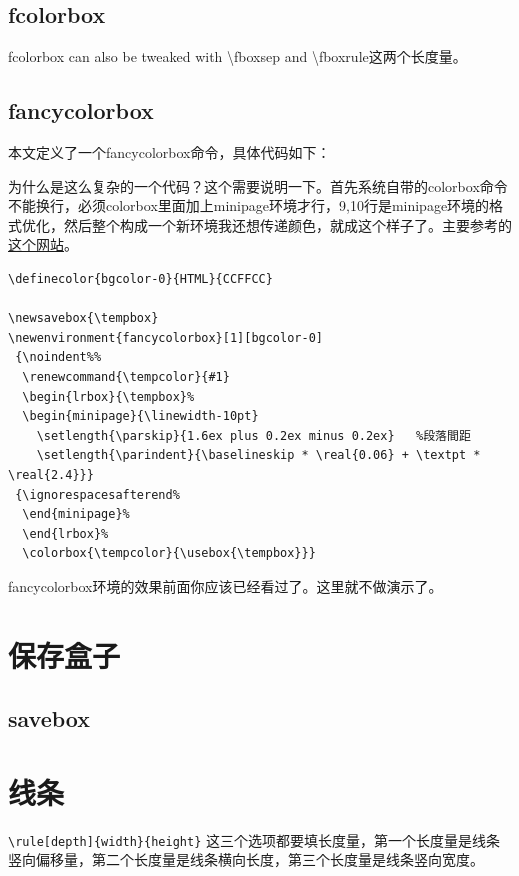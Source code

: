 \documentclass[11pt,oneside]{book}
\newlength{\textpt}
\begin{document}
\begin{common-format}
\subsection{fcolorbox}
fcolorbox can also be tweaked with \textbackslash fboxsep and \textbackslash fboxrule这两个长度量。

\subsection{fancycolorbox}
本文定义了一个fancycolorbox命令，具体代码如下：\\
\begin{fancycolorbox}
为什么是这么复杂的一个代码？这个需要说明一下。首先系统自带的colorbox命令不能换行，必须colorbox里面加上minipage环境才行，9,10行是minipage环境的格式优化，然后整个构成一个新环境我还想传递颜色，就成这个样子了。主要参考的\href{http://tex.stackexchange.com/questions/127612/color-text-and-bg-of-verbatim-without-affecting-fancyvrb-line-numbers}{这个网站}。
\end{fancycolorbox}
\vspace{20pt}
\begin{Verbatim}
\definecolor{bgcolor-0}{HTML}{CCFFCC} 

\newsavebox{\tempbox}
\newenvironment{fancycolorbox}[1][bgcolor-0]
 {\noindent%%
  \renewcommand{\tempcolor}{#1}
  \begin{lrbox}{\tempbox}%
  \begin{minipage}{\linewidth-10pt}
  	\setlength{\parskip}{1.6ex plus 0.2ex minus 0.2ex}   %段落間距
	\setlength{\parindent}{\baselineskip * \real{0.06} + \textpt * \real{2.4}}}  	
 {\ignorespacesafterend%
  \end{minipage}%
  \end{lrbox}%
  \colorbox{\tempcolor}{\usebox{\tempbox}}}  
\end{Verbatim}
fancycolorbox环境的效果前面你应该已经看过了。这里就不做演示了。

\section{保存盒子}
\subsection{savebox}


\section{线条}
\verb+\rule[depth]{width}{height}+
这三个选项都要填长度量，第一个长度量是线条竖向偏移量，第二个长度量是线条横向长度，第三个长度量是线条竖向宽度。


\end{common-format}
\end{document}
